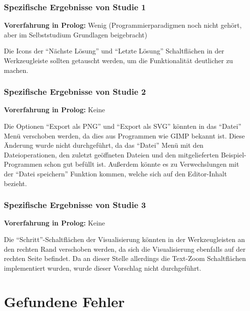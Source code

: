 \documentclass[parskip=full,11pt,twoside]{scrartcl}
\begin{document}
\subsubsection{Spezifische Ergebnisse von Studie 1} %

\textbf{Vorerfahrung in Prolog:} Wenig (Programmierparadigmen noch nicht gehört, aber im Selbststudium Grundlagen beigebracht)

Die Icons der \enquote{Nächste Lösung} und \enquote{Letzte Lösung} Schaltflächen in der Werkzeugleiste sollten getauscht werden, um die Funktionalität deutlicher zu machen.

\subsubsection{Spezifische Ergebnisse von Studie 2} %

\textbf{Vorerfahrung in Prolog:} Keine

Die Optionen \enquote{Export als PNG} und \enquote{Export als SVG} könnten in das \enquote{Datei} Menü verschoben werden, da dies aus Programmen wie GIMP bekannt ist. Diese Änderung wurde nicht durchgeführt, da das \enquote{Datei} Menü mit den Dateioperationen, den zuletzt geöffneten Dateien und den mitgelieferten Beispiel-Programmen schon gut befüllt ist. Außerdem könnte es zu Verwechslungen mit der \enquote{Datei speichern} Funktion kommen, welche sich auf den Editor-Inhalt bezieht.

\subsubsection{Spezifische Ergebnisse von Studie 3} %

\textbf{Vorerfahrung in Prolog:} Keine

Die \enquote{Schritt}-Schaltflächen der Visualisierung könnten in der Werkzeugleisten an den rechten Rand verschoben werden, da sich die Visualisierung ebenfalls auf der rechten Seite befindet. Da an dieser Stelle allerdings die Text-Zoom Schaltflächen implementiert wurden, wurde dieser Vorschlag nicht durchgeführt.

\section{Gefundene Fehler}
\end{document}
